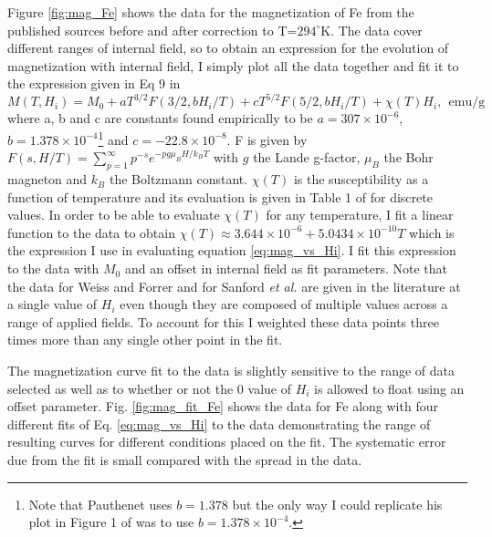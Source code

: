 \documentclass[12pt]{article}
\begin{document}
Figure \ref{fig:mag_Fe} shows the data for the magnetization of Fe from the published sources before and after correction to T=$294^{\circ}$K. The data cover different ranges of internal field, so to obtain an expression for the evolution of magnetization with internal field, I simply plot all the data together and fit it to the expression given in Eq 9 in \cite{PauthenetMar1982}
\begin{equation}
M(T,H_i)=M_0+aT^{3/2}F(3/2,bH_i/T)+cT^{5/2}F(5/2,b H_i/T)+\chi(T)H_i,~~\textrm{emu/g}
\label{eq:mag_vs_Hi}
\end{equation}
where a, b and c are constants found empirically to be $a=307\times 10^{-6}$, $b=1.378\times10^{-4}$\footnote{Note that Pauthenet uses $b=1.378$ but the only way I could replicate his plot in Figure 1 of \cite{PauthenetMar1982} was to use  $b=1.378\times10^{-4}$.} and $c=-22.8\times10^{-8}$. F is given by $F(s,H/T)=\sum_{p=1}^{\infty}p^{-s}e^{-pg\mu_BH/k_BT}$ with $g$ the Lande g-factor, $\mu_B$ the Bohr magneton and $k_B$ the Boltzmann constant. $\chi(T)$ is the susceptibility as a function of temperature and its evaluation is given in Table 1 of \cite{PauthenetMar1982} for discrete values. In order to be able to evaluate $\chi(T)$ for any temperature, I fit a linear function to the data to obtain $\chi(T)\approx3.644\times10^{-6}+5.0434\times10^{-10}T$ which is the expression I use in evaluating equation \ref{eq:mag_vs_Hi}. I fit this expression to the data with $M_0$ and an offset in internal field as fit parameters. Note that the data for Weiss and Forrer and for Sanford {\it et al.} are given in the literature at a single value of $H_i$ even though they are composed of multiple values across a range of applied fields. To account for this I weighted these data points three times more than any single other point in the fit. 

The magnetization curve fit to the data is slightly sensitive to the range of data selected as well as to whether or not the 0 value of $H_i$ is allowed to float using an offset parameter. Fig. \ref{fig:mag_fit_Fe} shows the data for Fe along with four different fits of Eq. \ref{eq:mag_vs_Hi} to the data demonstrating the range of resulting curves for different conditions placed on the fit. The systematic error due from the fit is small compared with the spread in the data. 
\end{document}
